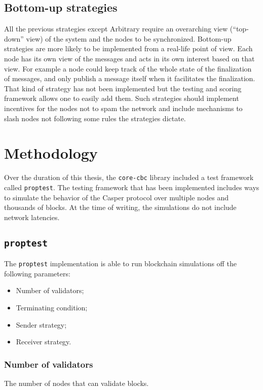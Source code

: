 \subsection{Bottom-up strategies}
\label{ssec:bottomUpStrats}
All the previous strategies except Arbitrary require an overarching view
(``top-down'' view) of the system and the nodes to be synchronized.
Bottom-up strategies are more likely to be implemented from a real-life point of
view. Each node has its own view of the messages and acts in its own interest
based on that view.
For example a node could keep track of the whole state of the finalization of
messages, and only publish a message itself when it facilitates the
finalization. That kind of strategy has not been implemented but the testing and
scoring framework allows one to easily add them.
Such strategies should implement incentives for the nodes not to spam the
network and include mechanisms to slash nodes not following some rules the
strategies dictate.

\section{Methodology}
Over the duration of this thesis, the \texttt{core-cbc} library included a
test framework called \texttt{proptest}. The testing framework that has been
implemented includes ways to simulate the behavior of the Casper protocol over
multiple nodes and thousands of blocks. At the time of
writing, the simulations do not include network latencies.

\subsection{\texttt{proptest}}
\label{ssec:proptest}
The \texttt{proptest} implementation is able to run blockchain simulations off
the following parameters:
\begin{itemize}
    \item Number of validators;
    \item Terminating condition;
    \item Sender strategy;
    \item Receiver strategy.
\end{itemize}

\subsubsection{Number of validators}
The number of nodes that can validate blocks.

